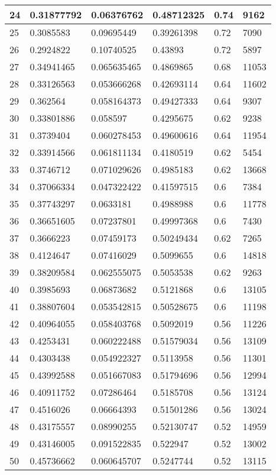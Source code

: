 \begin{longtable}{|l|l|l|l|l|l|}
24 & 0.31877792 & 0.06376762 & 0.48712325 & 0.74 & 9162 \\ \hline 
25 & 0.3085583 & 0.09695449 & 0.39261398 & 0.72 & 7090 \\ \hline 
26 & 0.2924822 & 0.10740525 & 0.43893 & 0.72 & 5897 \\ \hline 
27 & 0.34941465 & 0.065635465 & 0.4869865 & 0.68 & 11053 \\ \hline 
28 & 0.33126563 & 0.053666268 & 0.42693114 & 0.64 & 11602 \\ \hline 
29 & 0.362564 & 0.058164373 & 0.49427333 & 0.64 & 9307 \\ \hline 
30 & 0.33801886 & 0.058597 & 0.4295675 & 0.62 & 9238 \\ \hline 
31 & 0.3739404 & 0.060278453 & 0.49600616 & 0.64 & 11954 \\ \hline 
32 & 0.33914566 & 0.061811134 & 0.4180519 & 0.62 & 5454 \\ \hline 
33 & 0.3746712 & 0.071029626 & 0.4985183 & 0.62 & 13668 \\ \hline 
34 & 0.37066334 & 0.047322422 & 0.41597515 & 0.6 & 7384 \\ \hline 
35 & 0.37743297 & 0.0633181 & 0.4988988 & 0.6 & 11778 \\ \hline 
36 & 0.36651605 & 0.07237801 & 0.49997368 & 0.6 & 7430 \\ \hline 
37 & 0.3666223 & 0.07459173 & 0.50249434 & 0.62 & 7265 \\ \hline 
38 & 0.4124647 & 0.07416029 & 0.5099655 & 0.6 & 14818 \\ \hline 
39 & 0.38209584 & 0.062555075 & 0.5053538 & 0.62 & 9263 \\ \hline 
40 & 0.3985693 & 0.06873682 & 0.5121868 & 0.6 & 13105 \\ \hline 
41 & 0.38807604 & 0.053542815 & 0.50528675 & 0.6 & 11198 \\ \hline 
42 & 0.40964055 & 0.058403768 & 0.5092019 & 0.56 & 11226 \\ \hline 
43 & 0.4253431 & 0.060222488 & 0.51579034 & 0.56 & 13109 \\ \hline 
44 & 0.4303438 & 0.054922327 & 0.5113958 & 0.56 & 11301 \\ \hline 
45 & 0.43992588 & 0.051667083 & 0.51794696 & 0.56 & 12994 \\ \hline 
46 & 0.40911752 & 0.07286464 & 0.5185708 & 0.56 & 13124 \\ \hline 
47 & 0.4516026 & 0.06664393 & 0.51501286 & 0.56 & 13024 \\ \hline 
48 & 0.43175557 & 0.08990255 & 0.52130747 & 0.52 & 14959 \\ \hline 
49 & 0.43146005 & 0.091522835 & 0.522947 & 0.52 & 13002 \\ \hline 
50 & 0.45736662 & 0.060645707 & 0.5247744 & 0.52 & 13115 \\ \hline 
\end{longtable}